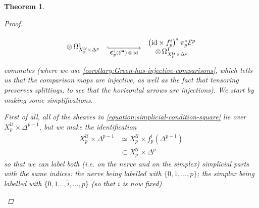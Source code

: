 \documentclass[11pt,fleqn]{article}
\theoremstyle{plain}
\newtheorem{theorem}{Theorem}[subsection]
\theoremstyle{definition}
\theoremstyle{remark}
\numberwithin{equation}{theorem}
\newcommand{\cover}{\mathcal{U}}
\newcommand{\id}{\mathrm{id}}
\newcommand{\nerve}[1]{X_{#1}^\cover}
\newcommand{\nervesimplex}[1]{\nerve{#1}\times\Delta^{#1}}
\newcommand{\comparison}[1]{\mathfrak{C}_{#1}}
\begin{document}
\begin{theorem}
\begin{proof}
\begin{enumerate}
\begin{equation}
\begin{tikzcd}[column sep=huge,row sep=7em]
\begin{tabular}{c}
                                    $\otimes\,\Omega^1_{\nervesimplex{p}}$
                                \end{tabular}
                                    \ar[r,hook,swap,"\comparison{p}^i(\mathcal{E}^\bullet)\,\otimes\,\id"]
                                &\begin{tabular}{c}
                                    $\left(\id\times f_p^i\right)^*\pi_p^*{\mathcal{E}^p}$\\
                                    $\otimes\,\Omega^1_{\nervesimplex{p}}$
                                \end{tabular}
                            \end{tikzcd}
                        \end{equation}
                        commutes (where we use \cref{corollary:Green-has-injective-comparisons}, which tells us that the comparison maps are injective, as well as the fact that tensoring preserves splittings, to see that the horizontal arrows are injections).
                        We start by making some simplifications.

                        First of all, all of the sheaves in \cref{equation:simplicial-condition-square} lie over $\nerve{p}\times\Delta^{p-1}$, but we make the identification
                        \begin{align*}
                            \nerve{p}\times\Delta^{p-1}
                            &\simeq
                            \nerve{p}\times f_p^i\left(\Delta^{p-1}\right)\\
                            &\subset
                            \nervesimplex{p}
                        \end{align*}
                        so that we can label \emph{both} (i.e. on the nerve and on the simplex) simplicial parts with the same indices: the nerve being labelled with $\{0,1,\ldots,p\}$; the simplex being labelled with $\{0,1\ldots,\hat{i},\ldots,p\}$ (so that $i$ is now fixed).


\end{enumerate}
\end{proof}
\end{theorem}
\end{document}
